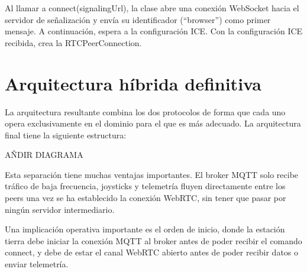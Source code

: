 Al llamar a connect(signalingUrl), la clase abre una conexión WebSocket hacia el servidor de señalización y envía su identificador (“browser”) como primer mensaje. A continuación, espera a la configuración ICE. Con la configuración ICE recibida, crea la RTCPeerConnection.

\section{Arquitectura híbrida definitiva}
La arquitectura resultante combina los dos protocolos de forma que cada uno opera exclusivamente en el dominio para el que es más adecuado. La arquitectura final tiene la siguiente estructura:

AÑDIR DIAGRAMA

Esta separación tiene muchas ventajas importantes. El broker MQTT solo recibe tráfico de baja frecuencia, joysticks y telemetría fluyen directamente entre los peers una vez se ha establecido la conexión WebRTC, sin tener que pasar por ningún servidor intermediario.

Una implicación operativa importante es el orden de inicio, donde la estación tierra debe iniciar la conexión MQTT al broker antes de poder recibir el comando connect, y debe de estar el canal WebRTC abierto antes de poder recibir datos o enviar telemetría. 



